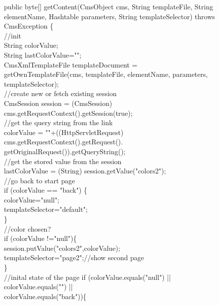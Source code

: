 \begin{java}
public byte[] getContent(CmsObject cms, String templateFile, String\\
elementName, Hashtable parameters, String templateSelector) throws CmsException \{\\
\jtabc        //init\\
\jtabc        String colorValue;\\
\jtabc        String lastColorValue="";\\
CmsXmlTemplateFile templateDocument =\\
getOwnTemplateFile(cms, templateFile, elementName, parameters,\\
templateSelector);\\
//create new or fetch existing session\\
CmsSession session = (CmsSession)\\
cms.getRequestContext().getSession(true);\\
\jtabc        //get the query string from the link\\
colorValue = ""+((HttpServletRequest)\\
cms.getRequestContext().getRequest().\\
getOriginalRequest()).getQueryString();\\
\jtabc        //get the stored value from the session\\
\jtabc        lastColorValue = (String) session.getValue("colors2");\\
\jtabc        //go back to start page\\
\jtabc        if (colorValue == "back") \{\\
\jtabd                colorValue="null";\\
\jtabd                templateSelector="default";\\
\jtabb        \}\\
\jtabb        //color chosen?\\
\jtabb        if (colorValue !="null")\{\\
\jtabd                session.putValue("colors2",colorValue);\\
\jtabd                templateSelector="page2";//show second page\\
\jtabb        \}\\
\jtabb        //inital state of the page if (colorValue.equals("null") ||\\
colorValue.equals("") ||\\
colorValue.equals("back"))\{\\

\end{java}
